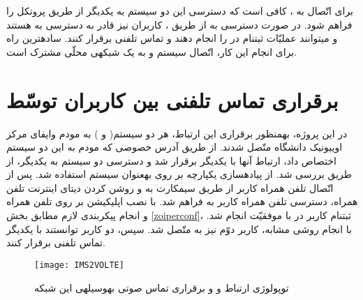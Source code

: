 برای اتّصال  به ، کافی است که دسترسی این دو سیستم به یکدیگر از طریق پروتکل  را فراهم شود. در صورت دسترسی  به  از طریق ، کاربران  نیز قادر به دسترسی به  هستند و می\nf توانند عملیّات ثبت\nf نام در  را انجام دهند و تماس تلفنی برقرار کنند. ساده\nf ترین راه برای انجام این کار، اتّصال سیستم  و  به یک شبکه\nf ی محلّی مشترک است.

\section{برقراری تماس تلفنی بین کاربران  توسّط }

در این پروژه، به\nf منظور برقراری این ارتباط، هر دو سیستم( و ) به مودم وای\nf فای مرکز اوییونیک دانشگاه متّصل شدند. از طریق آدرس  خصوصی که مودم به این دو سیستم اختصاص داد، ارتباط آن\nf ها با یکدیگر برقرار شد و دسترسی دو سیستم به یکدیگر، از طریق  بررسی شد. از پیاده\nf سازی یکپارچه  بر روی  به\nf عنوان سیستم  استفاده شد. پس از اتّصال تلفن همراه کاربر از طریق سیم\nf کارت به  و روشن کردن دیتای اینترنت تلفن همراه، دسترسی تلفن همراه کاربر به  فراهم شد. با نصب اپلیکیشن  بر روی تلفن همراه و انجام پیکربندی لازم مطابق بخش \ref{zoiperconf}، ثبت\nf نام کاربر در  با موفقیّت انجام شد. با انجام روشی مشابه، کاربر دوّم نیز به  متّصل شد. سپس، دو کاربر توانستند با یکدیگر تماس تلفنی برقرار کنند.

\begin{figure}[H]
\centering
\texttt{[image: IMS2VOLTE]}
\caption{توپولوژی ارتباط  و  و برقراری تماس صوتی به\nf وسیله\nf ی این شبکه}
\label{IMS2VOLTE}
\end{figure}
